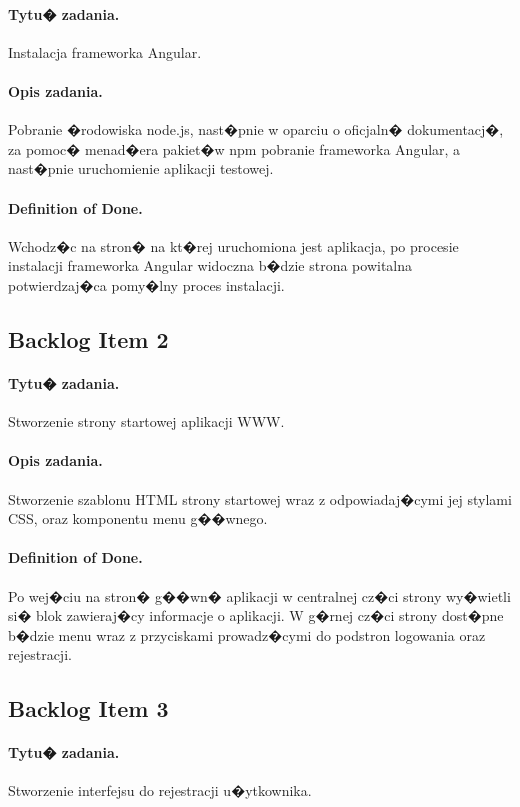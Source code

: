 ﻿\documentclass[a4paper]{article}
\begin{document}
\paragraph{Tytu� zadania.} Instalacja frameworka Angular.
\paragraph{Opis zadania.} Pobranie �rodowiska node.js, nast�pnie w oparciu o oficjaln� dokumentacj�, za pomoc� menad�era pakiet�w npm pobranie frameworka Angular, a nast�pnie uruchomienie aplikacji testowej. 
\paragraph{Definition of Done.} Wchodz�c na stron� na kt�rej uruchomiona jest aplikacja, po procesie instalacji frameworka Angular widoczna b�dzie strona powitalna potwierdzaj�ca pomy�lny proces instalacji.

\subsection{Backlog Item 2}
\paragraph{Tytu� zadania.} Stworzenie strony startowej aplikacji WWW.
\paragraph{Opis zadania.} Stworzenie szablonu HTML strony startowej wraz z odpowiadaj�cymi jej stylami CSS, oraz komponentu menu g��wnego.
\paragraph{Definition of Done.} Po wej�ciu na stron� g��wn� aplikacji w centralnej cz�ci strony wy�wietli si� blok zawieraj�cy
informacje o aplikacji. W g�rnej cz�ci strony dost�pne b�dzie menu wraz z przyciskami prowadz�cymi do podstron logowania oraz rejestracji.

\subsection{Backlog Item 3} 
\paragraph{Tytu� zadania.} Stworzenie interfejsu do rejestracji u�ytkownika.
\end{document}
